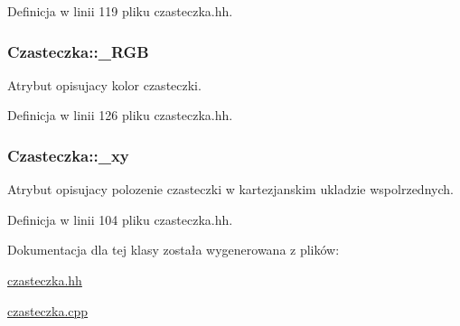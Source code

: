 Definicja w linii 119 pliku czasteczka.\+hh.

\hypertarget{class_czasteczka_ab9c93cfb3cf0360579ad0def2a94178c}{}
\subsubsection[{\+\_\+\+R\+G\+B}]{ Czasteczka\+::\+\_\+\+R\+G\+B\hspace{0.3cm}{\ttfamily [private]}}\label{class_czasteczka_ab9c93cfb3cf0360579ad0def2a94178c}
Atrybut opisujacy kolor czasteczki. 

Definicja w linii 126 pliku czasteczka.\+hh.

\hypertarget{class_czasteczka_a025a3ee895f8ee9c765814cfca1fd5e1}{}
\subsubsection[{\+\_\+xy}]{ Czasteczka\+::\+\_\+xy\hspace{0.3cm}{\ttfamily [private]}}\label{class_czasteczka_a025a3ee895f8ee9c765814cfca1fd5e1}
Atrybut opisujacy polozenie czasteczki w kartezjanskim ukladzie wspolrzednych. 

Definicja w linii 104 pliku czasteczka.\+hh.



Dokumentacja dla tej klasy została wygenerowana z plików\+:\begin{DoxyCompactItemize}
\item 
\hyperlink{czasteczka_8hh}{czasteczka.\+hh}\item 
\hyperlink{czasteczka_8cpp}{czasteczka.\+cpp}\end{DoxyCompactItemize}
